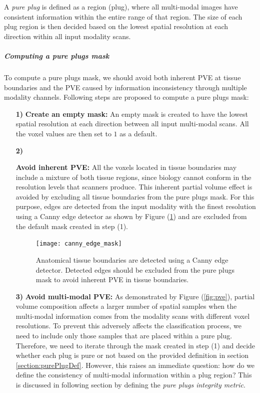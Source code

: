 A \textit{pure plug} is defined as a region (plug), where all multi-modal images have consistent information within the entire range of that region. The size of each plug region is then decided based on the lowest spatial resolution at each direction within all input modality scans.

\subparagraph{Computing a pure plugs mask}

To compute a pure plugs mask, we should avoid both inherent PVE at tissue boundaries and the PVE caused by information inconsistency through multiple modality channels.
Following steps are proposed to compute a pure plugs mask:

\begin{itemize}
\item[ \textbf{1)}]{
       \textbf{Create an empty mask:}
       An empty mask is created to have the lowest spatial resolution at each direction between all input multi-modal scans. All the voxel values are then set to $1$ as a default.
       }
\item[ \textbf{2)}]{
       \textbf{Avoid inherent PVE:}
        All the voxels located in tissue boundaries may include a mixture of both tissue regions, since biology cannot conform in the resolution levels that scanners produce. This inherent partial volume effect is avoided by excluding all tissue boundaries from the pure plugs mask. For this purpose, edges are detected from the input modality with the finest resolution using a Canny edge detector as shown by Figure (\ref{fig:canny_edge_mask}) and are excluded from the default mask created in step (1).
        
\begin{figure}
\centering
\texttt{[image: canny\_edge\_mask]}\
\centering
\caption{Anatomical tissue boundaries are detected using a Canny edge detector. Detected edges should be excluded from the pure plugs mask to avoid inherent PVE in tissue boundaries.} 
\label{fig:canny_edge_mask}
\end{figure}
        }
\item[ \textbf{3)}]{
       \textbf{Avoid multi-modal PVE:}
        As demonstrated by Figure (\ref{fig:pve}), partial  volume  composition  affects  a  larger  number  of  spatial  samples  when  the  multi-modal  information comes from the modality scans with different voxel resolutions. To prevent this adversely affects the classification process, we need to include only those samples that are placed within a pure plug. Therefore, we need to iterate through the mask created in step (1) and decide whether each plug is pure or not based on the provided definition in section \ref{section:purePlugDef}. However, this raises an immediate question: how do we define the consistency of multi-modal information within a plug region? This is discussed in following section by defining the \textit{pure plugs integrity metric}.
        }
\end{itemize}


